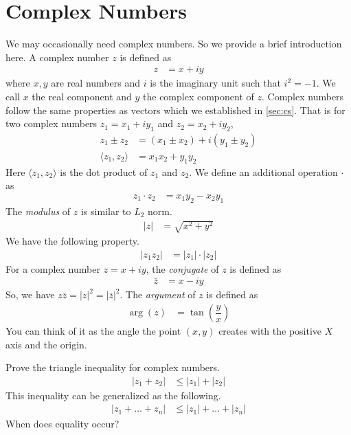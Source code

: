 \documentclass[inequalities.tex]{subfile}
\begin{document}
	\section{Complex Numbers}
	We may occasionally need complex numbers. So we provide a brief introduction here. A complex number $z$ is defined as
		\begin{align*}
			z
				& = x+iy
		\end{align*}
	where $x,y$ are real numbers and $i$ is the imaginary unit such that $i^{2}=-1$. We call $x$ the real component and $y$ the complex component of $z$. Complex numbers follow the same properties as vectors which we established in \autoref{sec:cs}. That is for two complex numbers $z_{1}=x_{1}+iy_{1}$ and $z_{2}=x_{2}+iy_{2}$,
		\begin{align*}
			z_{1}\pm z_{2}
				& = (x_{1}\pm x_{2})+i(y_{1}\pm y_{2})\\
			\langle z_{1},z_{2}\rangle
				& = x_{1}x_{2}+y_{1}y_{2}
		\end{align*}
	Here $\langle z_{1},z_{2}\rangle$ is the dot product of $z_{1}$ and $z_{2}$. We define an additional operation $\cdot$ as
		\begin{align*}
			z_{1}\cdot z_{2}
				& = x_{1}y_{2}-x_{2}y_{1}
		\end{align*}
	The \textit{modulus} of $z$ is similar to $L_{2}$ norm.
		\begin{align*}
			|z|
				& = \sqrt{x^{2}+y^{2}}
		\end{align*}
	We have the following property.
		\begin{align*}
			|z_{1}z_{2}|
				& = |z_{1}|\cdot|z_{2}|
		\end{align*}
	For a complex number $z=x+iy$, the \textit{conjugate} of $z$ is defined as
		\begin{align*}
			\bar{z}
				& = x-iy
		\end{align*}
	So, we have $z\bar{z}=|z|^{2}=|\bar{z}|^{2}$. The \textit{argument} of $z$ is defined as
		\begin{align*}
			\arg(z)
				& = \tan\left(\dfrac{y}{x}\right)
		\end{align*}
	You can think of it as the angle the point $(x,y)$ creates with the positive $X$ axis and the origin.
		\begin{problem}
			Prove the triangle inequality for complex numbers.
				\begin{align*}
					|z_{1}+z_{2}|
						& \leq |z_{1}|+|z_{2}|
				\end{align*}
			This inequality can be generalized as the following.
				\begin{align*}
					|z_{1}+\ldots+z_{n}|
						& \leq |z_{1}|+\ldots+|z_{n}|
				\end{align*}
			When does equality occur?
		\end{problem}
\end{document}
